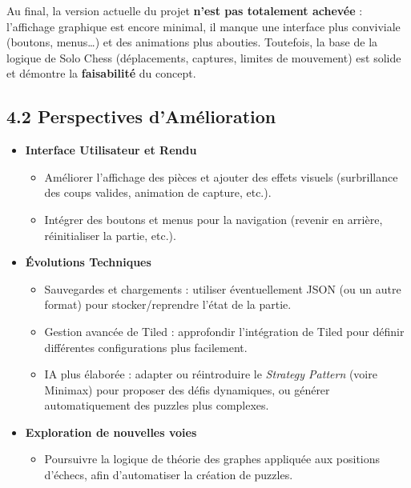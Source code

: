 \documentclass[11pt,a4paper]{article}
\begin{document}
Au final, la version actuelle du projet \textbf{n’est pas totalement achevée} : l’affichage graphique est encore minimal, il manque une interface plus conviviale (boutons, menus…) et des animations plus abouties. Toutefois, la base de la logique de Solo Chess (déplacements, captures, limites de mouvement) est solide et démontre la \textbf{faisabilité} du concept.

\subsection*{4.2 Perspectives d’Amélioration}

\begin{itemize}[leftmargin=1.5em]
    \item \textbf{Interface Utilisateur et Rendu}
    \begin{itemize}
        \item Améliorer l’affichage des pièces et ajouter des effets visuels (surbrillance des coups valides, animation de capture, etc.).
        \item Intégrer des boutons et menus pour la navigation (revenir en arrière, réinitialiser la partie, etc.).
    \end{itemize}

    \item \textbf{Évolutions Techniques}
    \begin{itemize}
        \item Sauvegardes et chargements : utiliser éventuellement JSON (ou un autre format) pour stocker/reprendre l’état de la partie.
        \item Gestion avancée de Tiled : approfondir l’intégration de Tiled pour définir différentes configurations plus facilement.
        \item IA plus élaborée : adapter ou réintroduire le \emph{Strategy Pattern} (voire Minimax) pour proposer des défis dynamiques, ou générer automatiquement des puzzles plus complexes.
    \end{itemize}

    \item \textbf{Exploration de nouvelles voies}
    \begin{itemize}
        \item Poursuivre la logique de théorie des graphes appliquée aux positions d’échecs, afin d’automatiser la création de puzzles.
    \end{itemize}
\end{itemize}
\end{document}
